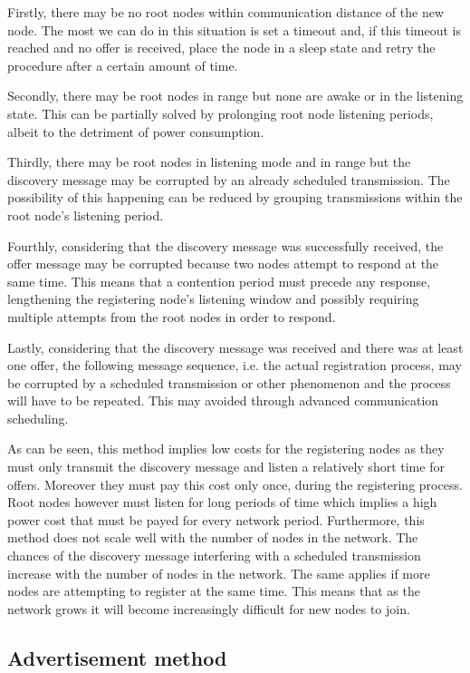 Firstly, there may be no root nodes within communication distance of the new
node. The most we can do in this situation is set a timeout and, if this
timeout is reached and no offer is received, place the node in a sleep state
and retry the procedure after a certain amount of time.

Secondly, there may be root nodes in range but none are awake or in the
listening state. This can be partially solved by prolonging root node listening
periods, albeit to the detriment of power consumption.

Thirdly, there may be root nodes in listening mode and in range but the
discovery message may be corrupted by an already scheduled transmission. The
possibility of this happening can be reduced by grouping transmissions within
the root node's listening period.

Fourthly, considering that the discovery message was
successfully received, the offer message may be corrupted because two nodes
attempt to respond at the same time. This means that a contention period must
precede any response, lengthening the registering node's listening window and
possibly requiring multiple attempts from the root nodes in order to
respond.

Lastly, considering that the discovery message was received and there was at
least one offer, the following message sequence, i.e. the actual registration
process, may be corrupted by a scheduled transmission or other phenomenon and
the process will have to be repeated. This may avoided through advanced
communication scheduling.

As can be seen, this method implies low costs for the registering nodes as they
must only transmit the discovery message and listen a relatively short time for
offers. Moreover they must pay this cost only once, during the registering process.
Root nodes however must listen for long periods of time which implies a high
power cost that must be payed for every network period. Furthermore, this method
does not scale well with the number of nodes in the network. The chances of the
discovery message interfering with a scheduled transmission increase with the
number of nodes in the network. The same applies if more nodes are attempting
to register at the same time. This means that as the network grows it will
become increasingly difficult for new nodes to join.

\subsection{Advertisement method}
\label{subsec:advertisement_method}

